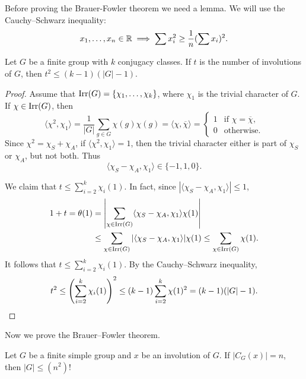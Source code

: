 Before proving the Brauer-Fowler theorem we
need a lemma. We will use the Cauchy--Schwarz inequality: 
\[
x_1,\dots,x_n\in\mathbb{R}\implies
\sum x_i^2\geq\frac{1}{n}(\sum x_i)^2.
\]

\begin{lemma}
    Let $G$ be a finite group with $k$ conjugacy classes. 
    If $t$ is the number of involutions of $G$, then
    $t^2\leq (k-1)(|G|-1)$. 
\end{lemma}

\begin{proof}
    Assume that $\operatorname{Irr}(G)=\{\chi_1,\dots,\chi_k\}$, where $\chi_1$ is the
    trivial character of $G$. 
    If $\chi\in\operatorname{Irr}(G)$, then 
    \[
        \langle\chi^2,\chi_1\rangle=\frac{1}{|G|}\sum_{g\in G}\chi(g)\chi(g)=\langle\chi,\overline{\chi}\rangle=\begin{cases}
        1 & \text{if $\chi=\overline{\chi}$},\\
        0 & \text{otherwise}.
        \end{cases}
    \]
    Since $\chi^2=\chi_S+\chi_A$, if $\langle\chi^2,\chi_1\rangle=1$, then
    the trivial character either is part of $\chi_S$ or $\chi_A$, but not both. 
    Thus
    \[
    \langle\chi_S-\chi_A,\chi_1\rangle\in\{-1,1,0\}.
    \]
    
    We claim that 
    $t\leq\sum_{i=2}^k\chi_i(1)$. In fact, since 
    $|\langle\chi_S-\chi_A,\chi_1\rangle|\leq 1$, 
    \begin{align*}
        1+t=\theta(1)
        &=\left|\sum_{\chi\in\operatorname{Irr}(G)}\langle\chi_S-\chi_A,\chi_1\rangle\chi(1)\right|\\
        &\leq\sum_{\chi\in\operatorname{Irr}(G)}|\langle\chi_S-\chi_A,\chi_1\rangle|\chi(1)
        \leq\sum_{\chi\in\operatorname{Irr}(G)}\chi(1).
    \end{align*}
    It follows that $t\leq\sum_{i=2}^k\chi_i(1)$. 
    By the Cauchy--Schwarz inequality, 
    \[
        t^2\leq\left(\sum_{i=2}^k\chi_i(1)\right)^2
        \leq(k-1)\sum_{i=2}^k\chi(1)^2=(k-1)(|G|-1).\qedhere
    \]
\end{proof}

Now we prove the Brauer--Fowler theorem. 

\begin{theorem}
    Let $G$ be a finite simple group and $x$ be an involution of $G$. If $|C_G(x)|=n$, then $|G|\leq (n^2)!$	
\end{theorem}

